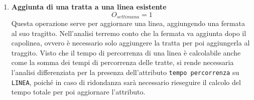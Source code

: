 \documentclass[12pt,a4paper]{report}
\begin{document}
\begin{enumerate}[label=\textbf{\arabic*)}]

    \item\textbf{Aggiunta di una tratta a una linea esistente} \label{op20} \\
    \[ {O_{settimana} = 1} \]
    Questa operazione serve per aggiornare una linea, aggiungendo una fermata al suo tragitto. Nell'analisi terremo conto che la fermata va aggiunta dopo il capolinea, ovvero è necessario solo aggiungere la tratta per poi aggiungerla al traggito. Visto che il tempo di percorrenza di una linea è calcolabile anche come la somma dei tempi di percorrenza delle tratte, si rende necessaria l'analisi differenziata per la presenza dell'attributo \texttt{tempo percorrenza} su \texttt{LINEA}, poiché in caso di ridondanza sarà necessario rieseguire il calcolo del tempo totale per poi aggiornare l'attributo.


\end{enumerate}
\end{document}

